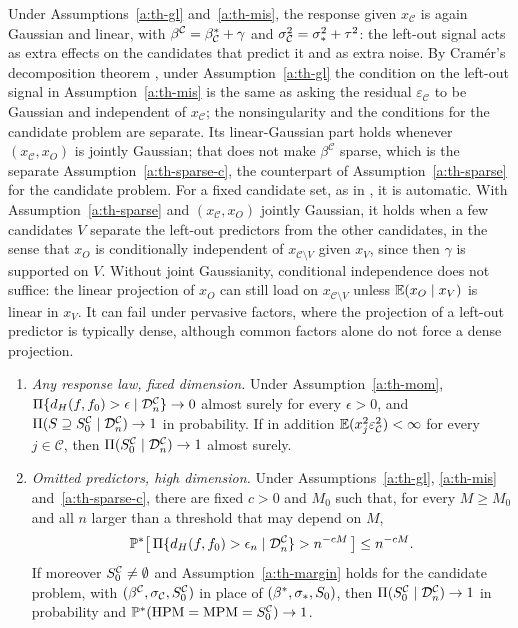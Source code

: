 Under Assumptions~\ref{a:th-gl} and~\ref{a:th-mis}, the response given $x_{\mathcal C}$ is again Gaussian and linear,
with $\beta^{\mathcal C}=\beta^*_{\mathcal C}+\gamma$ and $\sigma_{\mathcal C}^2=\sigma_*^2+\tau^2$: the left-out signal acts
as extra effects on the candidates that predict it and as extra noise. By Cram\'er's decomposition theorem \citep{Cramer1936}, under Assumption~\ref{a:th-gl} the condition on the left-out signal in
Assumption~\ref{a:th-mis} is the same as asking the residual $\varepsilon_{\mathcal C}$ to be Gaussian and independent
of $x_{\mathcal C}$; the nonsingularity and the conditions for the candidate problem are separate. Its linear-Gaussian part holds whenever $(x_{\mathcal C},x_O)$ is jointly Gaussian; that does not
make $\beta^{\mathcal C}$ sparse, which is the separate Assumption~\ref{a:th-sparse-c}, the counterpart of
Assumption~\ref{a:th-sparse} for the candidate problem. For a fixed candidate set, as in \citet{SongLiang2015}, it is
automatic. With Assumption~\ref{a:th-sparse} and $(x_{\mathcal C},x_O)$ jointly Gaussian, it holds when a few candidates $V$
separate the left-out predictors from the other candidates, in the sense that $x_O$ is conditionally independent of
$x_{\mathcal C\setminus V}$ given $x_V$, since then $\gamma$ is supported on $V$. Without joint Gaussianity,
conditional independence does not suffice: the linear projection of $x_O$ can still load on $x_{\mathcal C\setminus
V}$ unless $\operatorname{\mathbb{E}}(x_O\mid x_V)$ is linear in $x_V$. It can fail under pervasive factors, where the projection of a left-out
predictor is typically dense, although common factors alone do not force a dense projection.

\begin{conjecture}\label{conj:th-mis}
\leavevmode
\begin{enumerate}[label=(\alph*)]
  \item \emph{Any response law, fixed dimension.} Under Assumption~\ref{a:th-mom},
    $\Pi\{d_H(f,f_0)>\epsilon\mid\mathcal D_n^{\mathcal C}\}\to0$ almost surely for every $\epsilon>0$, and
    $\Pi(S\supseteq S_0^{\mathcal C}\mid\mathcal D_n^{\mathcal C})\to1$ in probability. If in addition
    $\operatorname{\mathbb{E}}(x_j^2\varepsilon_{\mathcal C}^2)<\infty$ for every $j\in\mathcal C$, then
    $\Pi(S_0^{\mathcal C}\mid\mathcal D_n^{\mathcal C})\to1$ almost surely.
  \item \emph{Omitted predictors, high dimension.} Under Assumptions~\ref{a:th-gl}, \ref{a:th-mis}
    and~\ref{a:th-sparse-c}, there are fixed $c>0$ and $M_0$ such that, for every $M\ge M_0$ and all $n$ larger than a threshold that may depend on $M$,
    \[
      \mathbb{P}^*\big[\,\Pi\{d_H(f,f_0)>\epsilon_n\mid\mathcal D_n^{\mathcal C}\}>n^{-cM}\,\big]\le n^{-cM}.
    \]
    If moreover $S_0^{\mathcal C}\ne\emptyset$ and Assumption~\ref{a:th-margin} holds for the candidate problem, with
    $(\beta^{\mathcal C},\sigma_{\mathcal C},S_0^{\mathcal C})$ in place of $(\beta^*,\sigma_*,S_0)$, then
    $\Pi(S_0^{\mathcal C}\mid\mathcal D_n^{\mathcal C})\to1$ in probability and $\mathbb{P}^*(\mathrm{HPM}=\mathrm{MPM}=S_0^{\mathcal C})\to1$.
\end{enumerate}
\end{conjecture}

